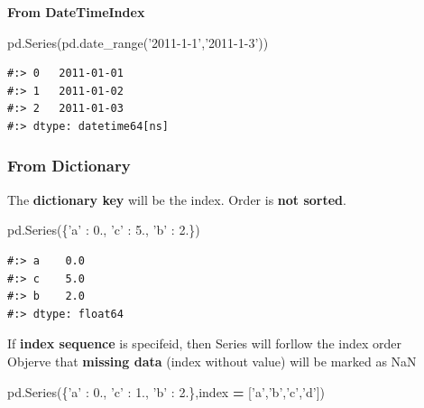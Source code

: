 \documentclass[
]{book}
\newenvironment{Shaded}{\begin{snugshade}}{\end{snugshade}}
\newcommand{\FloatTok}[1]{\textcolor[rgb]{0.06,0.06,0.06}{#1}}
\newcommand{\NormalTok}[1]{#1}
\newcommand{\OperatorTok}[1]{\textcolor[rgb]{0.43,0.43,0.43}{\textbf{#1}}}
\newcommand{\StringTok}[1]{\textcolor[rgb]{0.5,0.5,0.5}{#1}}
\begin{document}
\textbf{From DateTimeIndex}

\begin{Shaded}
\begin{Highlighting}[]
\NormalTok{pd.Series(pd.date_range(}\StringTok{'2011-1-1'}\NormalTok{,}\StringTok{'2011-1-3'}\NormalTok{))}
\end{Highlighting}
\end{Shaded}

\begin{verbatim}
#:> 0   2011-01-01
#:> 1   2011-01-02
#:> 2   2011-01-03
#:> dtype: datetime64[ns]
\end{verbatim}

\hypertarget{from-dictionary}{%
\subsubsection{From Dictionary}\label{from-dictionary}}

The \textbf{dictionary key} will be the index. Order is \textbf{not sorted}.

\begin{Shaded}
\begin{Highlighting}[]
\NormalTok{pd.Series(\{}\StringTok{'a'}\NormalTok{ : }\FloatTok{0.}\NormalTok{, }\StringTok{'c'}\NormalTok{ : }\FloatTok{5.}\NormalTok{, }\StringTok{'b'}\NormalTok{ : }\FloatTok{2.}\NormalTok{\})}
\end{Highlighting}
\end{Shaded}

\begin{verbatim}
#:> a    0.0
#:> c    5.0
#:> b    2.0
#:> dtype: float64
\end{verbatim}

If \textbf{index sequence} is specifeid, then Series will forllow the index order\\
Objerve that \textbf{missing data} (index without value) will be marked as NaN

\begin{Shaded}
\begin{Highlighting}[]
\NormalTok{pd.Series(\{}\StringTok{'a'}\NormalTok{ : }\FloatTok{0.}\NormalTok{, }\StringTok{'c'}\NormalTok{ : }\FloatTok{1.}\NormalTok{, }\StringTok{'b'}\NormalTok{ : }\FloatTok{2.}\NormalTok{\},index }\OperatorTok{=}\NormalTok{ [}\StringTok{'a'}\NormalTok{,}\StringTok{'b'}\NormalTok{,}\StringTok{'c'}\NormalTok{,}\StringTok{'d'}\NormalTok{])}
\end{Highlighting}
\end{Shaded}
\end{document}
